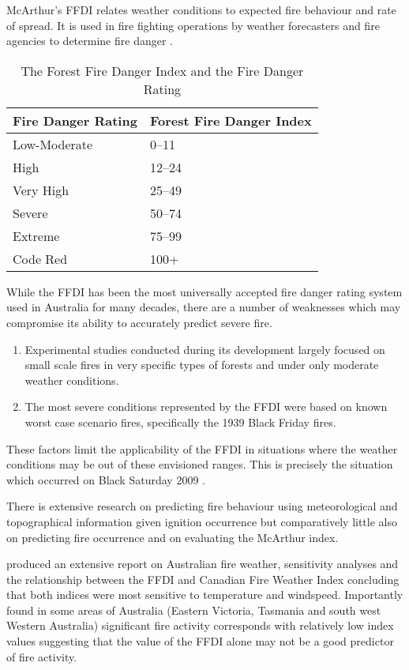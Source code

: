 \documentclass[11pt,a4paper]{article}
\begin{document}
McArthur's FFDI relates weather conditions to expected fire behaviour and rate of spread. It is used in fire fighting operations by weather forecasters and fire agencies to determine fire danger \citep{clarke2013}. 

\begin{table}[!ht]
	\centering
	\begin{tabular}{ll}
		\toprule
		Fire Danger Rating & Forest Fire Danger Index \\
		\midrule
		Low-Moderate              & 0--11 \\
		High                      & 12--24 \\
		Very High                 & 25--49\\
		Severe                    & 50--74\\
		Extreme                   & 75--99 \\
		Code Red                  & 100+ \\
		\bottomrule
	\end{tabular}
	\caption{The Forest Fire Danger Index and the Fire Danger Rating}
	\label{table:FDR}
\end{table}

While the FFDI has been the most universally accepted fire danger rating system used in Australia for many decades, there are a number of weaknesses which may compromise its ability to accurately predict severe fire. 

\begin{enumerate}
	\item Experimental studies conducted during its development largely focused on small scale fires in very specific types of forests and under only moderate weather conditions. 
	\item The most severe conditions represented by the FFDI were based on known worst case scenario fires, specifically the 1939 Black Friday fires.
\end{enumerate}

These factors limit the applicability of the FFDI in situations where the weather conditions may be out of these envisioned ranges. This is precisely the situation which occurred on Black Saturday 2009 \citep{harris12}. 

There is extensive research on predicting fire behaviour using meteorological and topographical information given ignition occurrence but comparatively little also on  predicting fire occurrence and on evaluating the McArthur index. 

\citet{dowdy10} produced an extensive report on Australian fire weather, sensitivity analyses and the relationship between the FFDI and Canadian Fire Weather Index concluding that both indices were most sensitive to temperature and windspeed. Importantly \citet{dowdy10} found in some areas of Australia (Eastern Victoria, Tasmania and south west Western Australia) significant fire activity corresponds with relatively low index values suggesting that the value of the FFDI alone may not be a good predictor of fire activity. 
\end{document}
